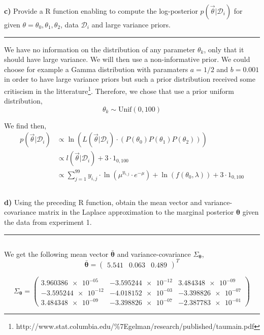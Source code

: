\textbf{c)} Provide a R function enabling to compute the log-posterior $p(\vec{\theta}|\mathcal{D}_i)$ for given $\theta = \theta_0, \theta_1, \theta_2$, data $\mathcal{D}_i$ and large variance priors.

\begin{center}\rule{6cm}{0.4pt}\end{center}

We have no information on the distribution of any parameter $\theta_k$, only that it should have large variance. We will then use a non-informative prior. We could choose for example a Gamma distribution with paramaters $a = 1/2$ and $b = 0.001$ in order to have large variance priors but such a prior distribution received some critiscism in the litterature\footnote{http://www.stat.columbia.edu/\%7Egelman/research/published/taumain.pdf}. Therefore, we chose that use a prior uniform distribution,
\begin{equation}
	\theta_k \sim \text{Unif}(0, 100)
\end{equation}

We find then,
\begin{align*}
	p(\vec{\theta}|\mathcal{D}_i)
		&\propto \ln(L(\vec{\theta}|\mathcal{D}_i) \cdot (P(\theta_0) P(\theta_1) P(\theta_2))) \\
		&\propto l(\vec{\theta}|\mathcal{D}_i) + 3 \cdot 1_{0, 100} \\
		&\propto \sum_{j=1}^{99} y_{i, j} \cdot \ln(\mu^{y_{i,j}} \cdot e^{-\mu}) + \ln(f(\theta_0, \lambda)) + 3 \cdot 1_{0, 100} 
\end{align*}

\inputminted[frame=lines, breaklines]{r}{code/q2c.r}

\textbf{d)} Using the preceding R function, obtain the mean vector and variance-covariance matrix in the Laplace approximation to the marginal posterior $\bm{\theta}$ given the data from experiment 1.

\begin{center}\rule{6cm}{0.4pt}\end{center}

\inputminted{r}{code/q2d.r}

We get the following mean vector $\bar{\bm{\theta}}$ and variance-covariance $\Sigma_{\bm{\theta}}$,
\begin{equation}
	\bar{\bm{\theta}} = 
	\begin{pmatrix}
		5.541 &  0.063 & 0.489
	\end{pmatrix}^T
\end{equation}

\begin{equation}
	\Sigma_{\bm{\theta}} =
	\begin{pmatrix}
		\num{3.960386e-05} & \num{-3.595244e-12} & \num{3.484348e-09} \\
		\num{-3.595244e-12} & \num{-4.018152e-03} & \num{-3.398826e-07} \\
		\num{3.484348e-09} & \num{-3.398826e-07} & \num{-2.387783e-01}
	\end{pmatrix}
\end{equation}